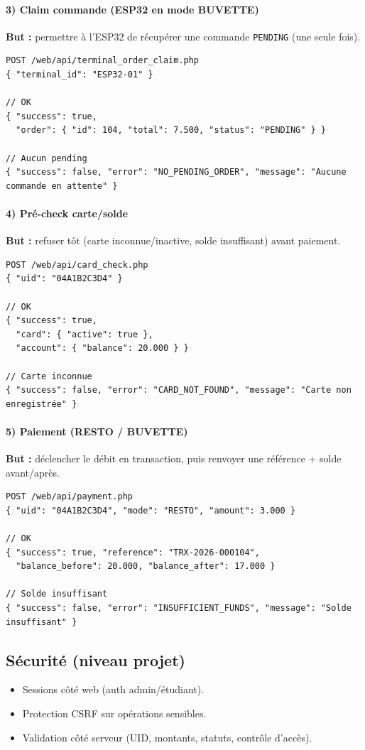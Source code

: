 \documentclass[12pt,a4paper]{report}
\begin{document}
\paragraph{3) Claim commande (ESP32 en mode BUVETTE)}
\textbf{But :} permettre à l’ESP32 de récupérer une commande \texttt{PENDING} (une seule fois).
\begin{lstlisting}
POST /web/api/terminal_order_claim.php
{ "terminal_id": "ESP32-01" }

// OK
{ "success": true,
  "order": { "id": 104, "total": 7.500, "status": "PENDING" } }

// Aucun pending
{ "success": false, "error": "NO_PENDING_ORDER", "message": "Aucune commande en attente" }
\end{lstlisting}

\paragraph{4) Pré-check carte/solde}
\textbf{But :} refuser tôt (carte inconnue/inactive, solde insuffisant) avant paiement.
\begin{lstlisting}
POST /web/api/card_check.php
{ "uid": "04A1B2C3D4" }

// OK
{ "success": true,
  "card": { "active": true },
  "account": { "balance": 20.000 } }

// Carte inconnue
{ "success": false, "error": "CARD_NOT_FOUND", "message": "Carte non enregistrée" }
\end{lstlisting}

\paragraph{5) Paiement (RESTO / BUVETTE)}
\textbf{But :} déclencher le débit en transaction, puis renvoyer une référence + solde avant/après.
\begin{lstlisting}
POST /web/api/payment.php
{ "uid": "04A1B2C3D4", "mode": "RESTO", "amount": 3.000 }

// OK
{ "success": true, "reference": "TRX-2026-000104",
  "balance_before": 20.000, "balance_after": 17.000 }

// Solde insuffisant
{ "success": false, "error": "INSUFFICIENT_FUNDS", "message": "Solde insuffisant" }
\end{lstlisting}

\subsection{Sécurité (niveau projet)}
\begin{itemize}
  \item Sessions côté web (auth admin/étudiant).
  \item Protection CSRF sur opérations sensibles.
  \item Validation côté serveur (UID, montants, statuts, contrôle d’accès).
\end{itemize}
\end{document}
